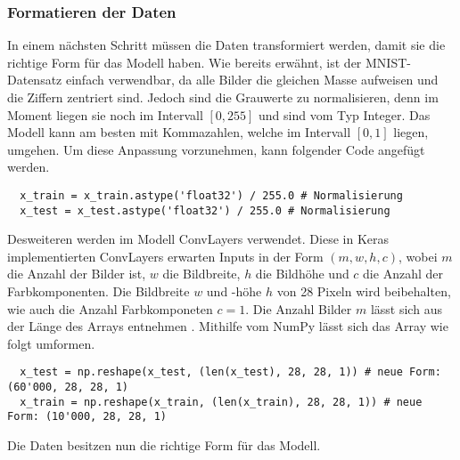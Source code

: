 \subsubsection{Formatieren der Daten}
In einem nächsten Schritt müssen die Daten transformiert werden, damit sie die
richtige Form für das Modell haben.
Wie bereits erwähnt, ist der MNIST-Datensatz einfach verwendbar,
da alle Bilder die gleichen Masse aufweisen und die Ziffern zentriert sind.
\para{}
Jedoch sind die Grauwerte zu normalisieren, denn im Moment liegen sie noch im
Intervall $[0, 255]$ und sind vom Typ Integer.
Das Modell kann am besten mit Kommazahlen, welche im Intervall $[0,1]$ liegen,
umgehen. Um diese Anpassung vorzunehmen, kann folgender Code angefügt werden.
\begin{verbatim}
  x_train = x_train.astype('float32') / 255.0 # Normalisierung
  x_test = x_test.astype('float32') / 255.0 # Normalisierung
\end{verbatim}
Desweiteren werden im Modell ConvLayers verwendet. Diese in Keras
implementierten ConvLayers erwarten Inputs in der Form $(m, w, h, c)$, wobei
$m$ die Anzahl der Bilder ist, $w$ die Bildbreite, $h$ die Bildhöhe und $c$ die
Anzahl der Farbkomponenten. Die Bildbreite $w$ und -höhe $h$ von 28 Pixeln wird beibehalten, wie auch
die Anzahl Farbkomponeten $c=1$. Die Anzahl Bilder $m$ lässt sich aus der Länge
des Arrays entnehmen . Mithilfe vom NumPy lässt sich das Array wie folgt umformen.
\begin{verbatim}
  x_test = np.reshape(x_test, (len(x_test), 28, 28, 1)) # neue Form: (60'000, 28, 28, 1)
  x_train = np.reshape(x_train, (len(x_train), 28, 28, 1)) # neue Form: (10'000, 28, 28, 1)
\end{verbatim}
Die Daten besitzen nun die richtige Form für das Modell.

